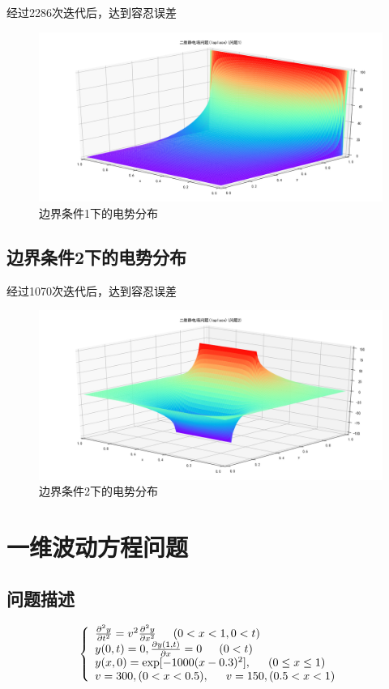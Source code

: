 \documentclass[11pt]{ctexart}
\begin{document}
经过2286次迭代后，达到容忍误差
\begin{figure}[ht]
\centering
\includegraphics[width=0.8\linewidth]{Pyfingure/Figure_2_1.png} 
\caption{边界条件1下的电势分布}
\end{figure}

\subsection{边界条件2下的电势分布}

经过1070次迭代后，达到容忍误差
\begin{figure}[ht]
\centering
\includegraphics[width=0.8\linewidth]{Pyfingure/Figure_2_2.png} 
\caption{边界条件2下的电势分布}
\end{figure}

\section{一维波动方程问题}

\subsection{问题描述}

\begin{equation}
\left\lbrace 
\begin{array}{l}
\frac{\partial^{2}y}{\partial t^{2}}=v^{2}\frac{\partial^{2}y}{\partial x^{2}} \indent (0<x<1, 0<t)\\
y(0,t)=0,\frac{\partial y(1,t)}{\partial x}=0 \indent (0<t)\\
y(x,0)=\exp[-1000(x-0.3)^{2}], \indent (0\leq x\leq 1) \\
v=300,(0<x<0.5),\indent v=150,(0.5<x<1)
\end{array}
\right. 
\end{equation}
\end{document}
